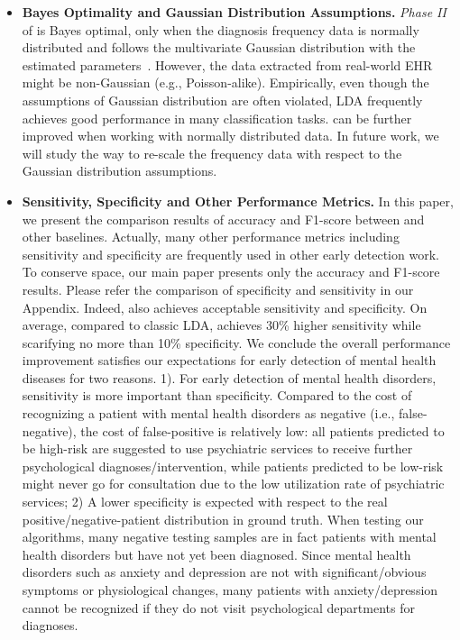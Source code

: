 \begin{itemize}

\item \textbf{Bayes Optimality and Gaussian Distribution Assumptions. } \emph{Phase II} of \TheName{} is Bayes optimal, only when the diagnosis frequency data is normally distributed and follows the multivariate Gaussian distribution with the estimated parameters~\cite{hamsici2008bayes}. 
However, the data extracted from real-world EHR might be non-Gaussian (e.g., Poisson-alike). Empirically, even though the assumptions of Gaussian distribution are often violated, LDA frequently achieves good performance in many classification tasks. 
\TheName{} can be further improved when working with normally distributed data. 
In future work, we will study the way to re-scale the frequency data with respect to the Gaussian distribution assumptions.

\item \textbf{Sensitivity, Specificity and Other Performance Metrics. } In this paper, we present the comparison results of accuracy and F1-score between \TheName{} and other baselines. 
Actually, many other performance metrics including sensitivity and specificity are frequently used in other early detection work. 
To conserve space, our main paper presents only the accuracy and F1-score results. 
Please refer the comparison of specificity and sensitivity in our Appendix. 
Indeed, \TheName{} also achieves acceptable sensitivity and specificity. 
On average, compared to classic LDA, \TheName{} achieves 30\% higher sensitivity while scarifying no more than 10\% specificity. 
We conclude the overall performance improvement satisfies our expectations for early detection of mental health diseases for two reasons.  1). For early detection of mental health disorders, sensitivity is more important than specificity.  
Compared to the cost of recognizing a patient with mental health disorders as negative (i.e., false-negative), the cost of false-positive is relatively low: 
all patients predicted to be high-risk are suggested to use psychiatric services to receive further psychological diagnoses/intervention, while patients predicted to be low-risk might never go for consultation due to the low utilization rate of psychiatric services; 
2) A lower specificity is expected with respect to the real positive/negative-patient distribution in ground truth. 
When testing our algorithms, many negative testing samples are in fact patients with mental health disorders but have not yet been diagnosed. 
Since mental health disorders such as anxiety and depression are not with significant/obvious symptoms or physiological changes, many patients with anxiety/depression cannot be recognized if they do not visit psychological departments for diagnoses.


\end{itemize}

